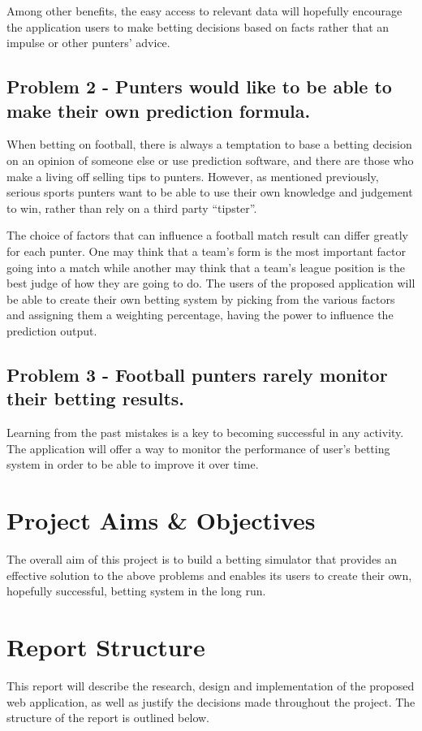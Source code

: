 Among other benefits, the easy access to relevant data will hopefully encourage the application users to make betting decisions based on facts rather that an impulse or other punters’ advice.

\subsection*{Problem 2 - Punters would like to be able to make their own prediction formula.}
When betting on football, there is always a temptation to base a betting decision on an opinion of someone else or use prediction software, and there are those who make a living off selling tips to punters. However, as mentioned previously, serious sports punters want to be able to use their own knowledge and judgement to win, rather than rely on a third party “tipster”.

The choice of factors that can influence a football match result can differ greatly for each punter. One may think that a team’s form is the most important factor going into a match while another may think that a team’s league position is the best judge of how they are going to do. The users of the proposed application will be able to create their own betting system by picking from the various factors and assigning them a weighting percentage, having the power to influence the prediction output.

\subsection*{Problem 3 - Football punters rarely monitor their betting results.}
Learning from the past mistakes is a key to becoming successful in any activity. The application will offer a way to monitor the performance of user's betting system in order to be able to improve it over time.

\section{Project Aims \& Objectives}
\label{sec:objectives_intro}
The overall aim of this project is to build a betting simulator that provides an effective solution to the above problems and enables its users to create their own, hopefully successful, betting system in the long run.

\section{Report Structure}
\label{sec:reportstructure_intro}
This report will describe the research, design and implementation of the proposed web application, as well as justify the decisions made throughout the project.
The structure of the report is outlined below.

